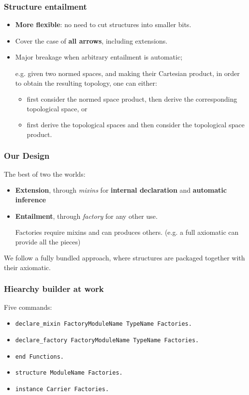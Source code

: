 \documentclass[11pt]{beamer}
\let\L=\lstinline
\begin{document}
\begin{frame}
  \frametitle{Structure entailment}

  \begin{itemize}
  \item \textbf{More flexible}: no need to cut structures into smaller
    bits.
  \item Cover the case of \textbf{all arrows}, including extensions.
    \pause\vfill
  \item Major breakage when arbitrary entailment is automatic;

    e.g. given two normed spaces, and making their Cartesian product, in
    order to obtain the resulting topology, one can either:
    \begin{itemize}
    \item first consider the normed space product, then derive the
      corresponding topological space, or
    \item first derive the topological spaces and then consider the
      topological space product.
    \end{itemize}
  \end{itemize}

\end{frame}

\begin{frame}
  \frametitle{Our Design}

  The best of two the worlds:
  \begin{itemize}
  \item \textbf{Extension}, through \emph{mixins} for \textbf{internal declaration} and
    \textbf{automatic inference}

  \item \textbf{Entailment}, through \emph{factory} for any other use.

    Factories require mixins and can produces others.
    (e.g. a full axiomatic can provide all the pieces)
  \end{itemize}

  \pause  \vfill

  We follow a fully bundled approach, where structures are packaged
  together with their axiomatic.
  
\end{frame}


\begin{frame}[fragile]
  \frametitle{Hiearchy builder at work}
  
  Five commands:
  \begin{itemize}
  \item \L{declare_mixin FactoryModuleName TypeName Factories.}
  \item \L{declare_factory FactoryModuleName TypeName Factories.}
  \item \L{end Functions.}
  \item \L{structure ModuleName Factories.}
  \item \L{instance Carrier Factories.}
  \end{itemize}
  \vfill {}
  
\end{frame}
\end{document}
